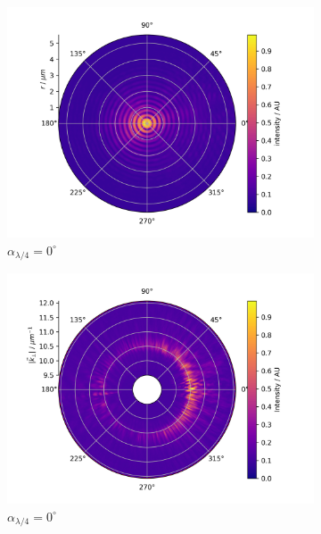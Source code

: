 \documentclass[titlepage,  ngerman]{article}
\begin{document}
	\begin{figure}[h!]
	\label{fig:measure_linear_polarisation}
	
	\begin{subfigure}[b]{0.49\textwidth}
		\centering
		\includegraphics[width=\textwidth]{figures/fp/fp_0.png}
		\caption{$\alpha_{\lambda/4} = 0^\circ$}
	\end{subfigure}
	\begin{subfigure}[b]{0.5\textwidth}
		\centering
		\includegraphics[width=\textwidth]{figures/spin_hall/polar/polar_0.png}
		\caption{$\alpha_{\lambda/4} = 0^\circ$}
	\end{subfigure}
	\hfill
	\begin{subfigure}[b]{0.49\textwidth}

\end{subfigure}
\end{figure}
\end{document}
